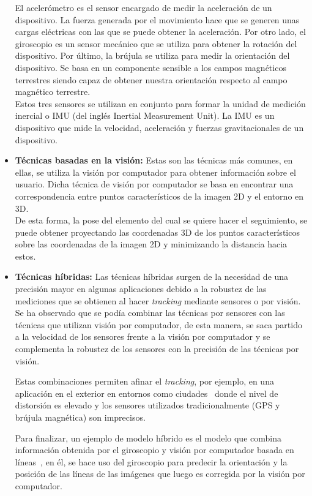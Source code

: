 \begin{itemize}
    El acelerómetro es el sensor encargado de medir la aceleración de un dispositivo. La fuerza generada por el movimiento hace que se generen unas cargas eléctricas con las que se puede obtener la aceleración. Por otro lado, el giroscopio es un sensor mecánico que se utiliza para obtener la rotación del dispositivo. Por último, la brújula se utiliza para medir la orientación del dispositivo. Se basa en un componente sensible a los campos magnéticos terrestres siendo capaz de obtener nuestra orientación respecto al campo magnético terrestre.\\
    
    Estos tres sensores se utilizan en conjunto para formar la unidad de medición inercial o IMU (del inglés Inertial Measurement Unit). La IMU es un dispositivo que mide la velocidad, aceleración y fuerzas gravitacionales de un dispositivo.
    
    \item \textbf{Técnicas basadas en la visión:} Estas son las técnicas más comunes, en ellas, se utiliza la visión por computador para obtener información sobre el usuario. Dicha técnica de visión por computador se basa en encontrar una correspondencia entre puntos característicos de la imagen 2D y el entorno en 3D.\\ 
    
    De esta forma, la pose del elemento del cual se quiere hacer el seguimiento, se puede obtener proyectando las coordenadas 3D de los puntos característicos sobre las coordenadas de la imagen 2D y minimizando la distancia hacia estos.
    
    \item \textbf{Técnicas híbridas:} Las técnicas híbridas surgen de la necesidad de una precisión mayor en algunas aplicaciones debido a la robustez de las mediciones que se obtienen al hacer \textit{tracking} mediante sensores o por visión. Se ha observado que se podía combinar las técnicas por sensores con las técnicas que utilizan visión por computador, de esta manera, se saca partido a la velocidad de los sensores frente a la visión por computador y se complementa la robustez de los sensores con la precisión de las técnicas por visión. 
    
    Estas combinaciones permiten afinar el \textit{tracking}, por ejemplo, en una aplicación en el exterior en entornos como ciudades~\cite{hybridtrackingUrban} donde el nivel de distorsión es elevado y los sensores utilizados tradicionalmente (GPS y brújula magnética) son imprecisos.
    
    Para finalizar, un ejemplo de modelo híbrido es el modelo que combina información obtenida por el giroscopio y visión por computador basada en líneas~\cite{robustHybridmodel}, en él, se hace uso del giroscopio para predecir la orientación y la posición de las líneas de las imágenes que luego es corregida por la visión por computador.
    
\end{itemize}

